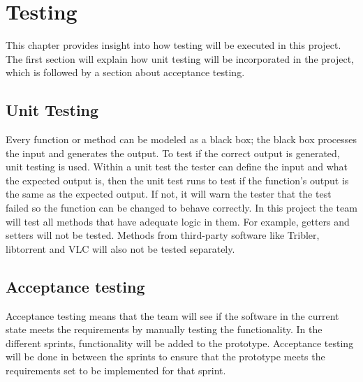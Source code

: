 \chapter{Testing}
\thispagestyle{fancy}
\label{sec:test}
This chapter provides insight into how testing will be executed in this project. The first section will explain how unit testing will be incorporated  in the project, which is followed by a section about acceptance testing.

\section{Unit Testing}
Every function or method can be modeled as a black box; the black box processes the input and generates the output. To test if the correct output is generated, unit testing is used. Within a unit test the tester can define the input and what the expected output is, then the unit test runs to test if the function's output is the same as the expected output. If not, it will warn the tester that the test failed so the function can be changed to behave correctly. 
In this project the team will test all methods that have adequate logic in them. For example, getters and setters will not be tested. Methods from third-party software like Tribler, libtorrent and VLC will also not be tested separately. 

\section{Acceptance testing}
Acceptance testing means that the team will see if the software in the current state meets the requirements by manually testing the functionality. In the different sprints, functionality will be added to the prototype. Acceptance testing will be done in between the sprints to ensure that the prototype meets the requirements set to be implemented for that sprint.